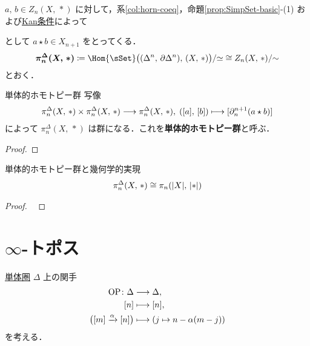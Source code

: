 \documentclass[TQFT_main]{subfiles}
\begin{document}
$a,\, b \in Z_n (X,\, *)$ に対して，系\ref{col:horn-coeq}，命題\ref{prop:SimpSet-basic}-(1) および\hyperref[def:infinity-1]{Kan条件}によって
\begin{center}
\end{center}
として $a \star b \in X_{n+1}$ をとってくる．
\begin{align}
    \bm{\pi^\Delta_n (X,\, *)} \coloneqq \Hom{\sSet} \bigl( (\Delta^n,\, \partial\Delta^n),\, (X,\, *) \bigr) / {\simeq} \cong Z_n (X,\, *) /{\sim}
\end{align}
とおく．

\begin{myprop}[label=def:simpi]{単体的ホモトピー群}
    写像
    \begin{align}
        \pi^\Delta_n (X,\, *) \times \pi^\Delta_n (X,\, *) \longrightarrow \pi^\Delta_n (X,\, *),\; ([a],\, [b]) \longmapsto [\partial^{n+1}_n (a \star b)]
    \end{align}
    によって $\pi^\Delta_n (X,\, *)$ は群になる．これを\textbf{単体的ホモトピー群}と呼ぶ．
\end{myprop}

\begin{proof}
    
\end{proof}

\begin{mytheo}[label=thm:homotopygrp]{単体的ホモトピー群と幾何学的実現}
    \begin{align}
        \pi^\Delta_n (X,\, *) \cong \pi_n (\abs{X},\, \abs{*})
    \end{align}
\end{mytheo}

\begin{proof}
    ~\cite[p.64, PROPOSITION 11.1]{goerss2009simplicial}
\end{proof}

\section{$\infty$-トポス}

\hyperref[def:SimpSet]{単体圏} $\Delta$ 上の関手
\begin{align}
    \mathrm{OP} \colon \Delta &\longrightarrow \Delta, \\
    [n] &\longmapsto [n], \\
    \bigl( [m] \xrightarrow{\alpha} [n] \bigr) &\longmapsto (j \mapsto n - \alpha (m-j))
\end{align}
を考える．
\end{document}
